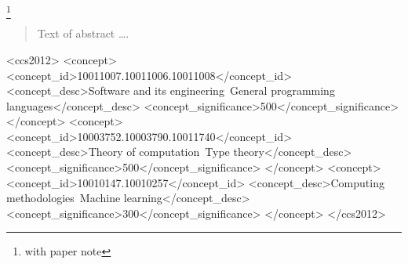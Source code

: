 \documentclass[acmlarge,review,anonymous]{acmart}\settopmatter{printfolios=true}
\begin{document}
\author{Ranjit Jhala}

\author{Westley Weimer}


\thanks{with paper note}                %


\begin{abstract}
Text of abstract \ldots.
\end{abstract}


\begin{CCSXML}
<ccs2012>
<concept>
<concept_id>10011007.10011006.10011008</concept_id>
<concept_desc>Software and its engineering~General programming languages</concept_desc>
<concept_significance>500</concept_significance>
</concept>
<concept>
<concept_id>10003752.10003790.10011740</concept_id>
<concept_desc>Theory of computation~Type theory</concept_desc>
<concept_significance>500</concept_significance>
</concept>
<concept>
<concept_id>10010147.10010257</concept_id>
<concept_desc>Computing methodologies~Machine learning</concept_desc>
<concept_significance>300</concept_significance>
</concept>
</ccs2012>
\end{CCSXML}
\end{document}
